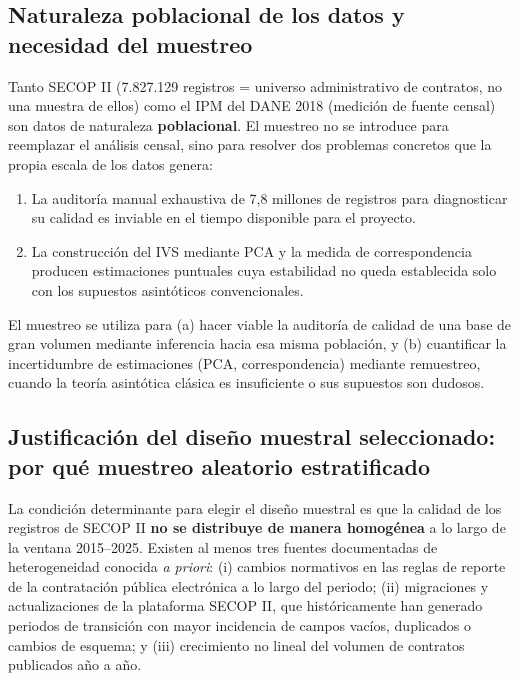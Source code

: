 \documentclass[11pt,letterpaper]{article}
\newenvironment{recuadro}[1]{%
  \begin{tcolorbox}[breakable,colback=boxbg,colframe=ustablue,boxrule=0.6pt,arc=1.5pt,
  title={\small\bfseries #1},fonttitle=\small,coltitle=white,colbacktitle=ustablue,
  left=6pt,right=6pt,top=4pt,bottom=4pt]
}{\end{tcolorbox}}
\begin{document}
\subsection{Naturaleza poblacional de los datos y necesidad del muestreo}

Tanto SECOP II (7.827.129 registros = universo administrativo de contratos, no
una muestra de ellos) como el IPM del DANE 2018 (medición de fuente censal) son
datos de naturaleza \textbf{poblacional}. El muestreo no se introduce para
reemplazar el análisis censal, sino para resolver dos problemas concretos que
la propia escala de los datos genera:

\begin{enumerate}
\item La auditoría manual exhaustiva de 7,8 millones de registros para
diagnosticar su calidad es inviable en el tiempo disponible para el proyecto.
\item La construcción del IVS mediante PCA y la medida de correspondencia
producen estimaciones puntuales cuya estabilidad no queda establecida solo con
los supuestos asintóticos convencionales.
\end{enumerate}

\begin{recuadro}{Principio metodológico}
El muestreo se utiliza para (a) hacer viable la auditoría de calidad de una
base de gran volumen mediante inferencia hacia esa misma población, y (b)
cuantificar la incertidumbre de estimaciones (PCA, correspondencia) mediante
remuestreo, cuando la teoría asintótica clásica es insuficiente o sus
supuestos son dudosos.
\end{recuadro}

\subsection{Justificación del diseño muestral seleccionado: por qué muestreo aleatorio estratificado}

La condición determinante para elegir el diseño muestral es que la calidad de
los registros de SECOP II \textbf{no se distribuye de manera homogénea} a lo
largo de la ventana 2015--2025. Existen al menos tres fuentes documentadas de
heterogeneidad conocida \textit{a priori}: (i) cambios normativos en las reglas
de reporte de la contratación pública electrónica a lo largo del periodo; (ii)
migraciones y actualizaciones de la plataforma SECOP II, que históricamente han
generado periodos de transición con mayor incidencia de campos vacíos,
duplicados o cambios de esquema; y (iii) crecimiento no lineal del volumen de
contratos publicados año a año.
\end{document}

